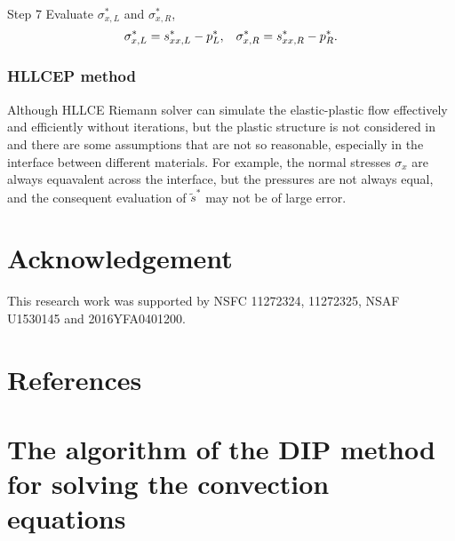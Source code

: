 \documentclass{article}
\theoremstyle{plain}\newtheorem{definition}{\sc{Definition}}
\theoremstyle{defination}\newtheorem{example}{Example}[section]
\numberwithin{equation}{section}
\numberwithin{table}{section}
\begin{document}
Step 7 Evaluate $\sigma_{x,L}^*$ and $\sigma_{x,R}^*$,
\begin{equation}
  \sigma_{x,L}^* = s_{xx,L}^* - p_L^*, \hspace{0.3cm} \sigma_{x,R}^* = s_{xx,R}^*- p_R^*.
\end{equation}
\subsubsection{HLLCEP method}
Although HLLCE Riemann solver can simulate the elastic-plastic flow effectively and efficiently without iterations, but the plastic structure is not considered in and  there are some assumptions that are not so reasonable, especially in the interface between different materials. For example, the normal stresses $\sigma_x$ are  always equavalent across the interface, but the pressures are not always equal, and the consequent evaluation of $\widetilde{s}^*$ may not be of large error. 












	















 



%
\section*{Acknowledgement} 
This research work was supported by NSFC 11272324, 11272325, NSAF U1530145 and 2016YFA0401200.

\section*{References}



\newpage
  \appendix
  \renewcommand{\appendixname}{Appendix~}

  \section{The algorithm of the DIP method for solving the convection equations}
\large {\color{black!60!red!80!}}
  \color{black}
\end{document}
